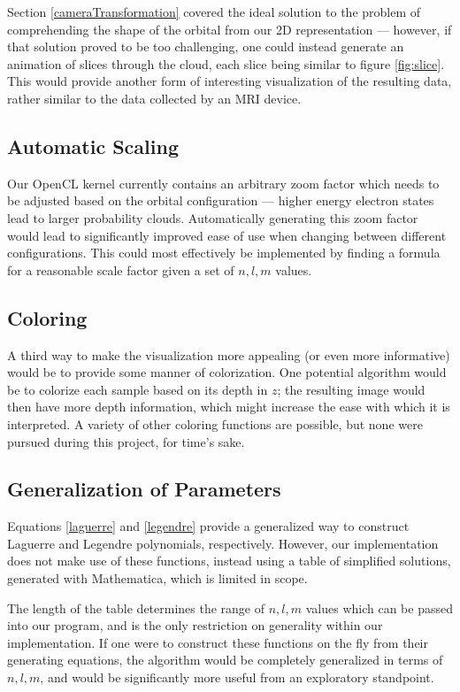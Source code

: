 \documentclass{acmsiggraph}
\begin{document}
Section \ref{cameraTransformation} covered the ideal solution to the problem of comprehending the shape of the orbital from our 2D representation --- however, if that solution proved to be too challenging, one could instead generate an animation of slices through the cloud, each slice being similar to figure \ref{fig:slice}. This would provide another form of interesting visualization of the resulting data, rather similar to the data collected by an MRI device.

\subsection{Automatic Scaling}

Our OpenCL kernel currently contains an arbitrary zoom factor which needs to be adjusted based on the orbital configuration --- higher energy electron states lead to larger probability clouds. Automatically generating this zoom factor would lead to significantly improved ease of use when changing between different configurations. This could most effectively be implemented by finding a formula for a reasonable scale factor given a set of $n, l, m$ values.

\subsection{Coloring}

A third way to make the visualization more appealing (or even more informative) would be to provide some manner of colorization. One potential algorithm would be to colorize each sample based on its depth in $z$; the resulting image would then have more depth information, which might increase the ease with which it is interpreted. A variety of other coloring functions are possible, but none were pursued during this project, for time's sake.

\subsection{Generalization of Parameters}

Equations \ref{laguerre} and \ref{legendre} provide a generalized way to construct Laguerre and Legendre polynomials, respectively. However, our implementation does not make use of these functions, instead using a table of simplified solutions, generated with Mathematica, which is limited in scope.

The length of the table determines the range of $n, l, m$ values which can be passed into our program, and is the only restriction on generality within our implementation. If one were to construct these functions on the fly from their generating equations, the algorithm would be completely generalized in terms of $n, l, m$, and would be significantly more useful from an exploratory standpoint.
\end{document}
